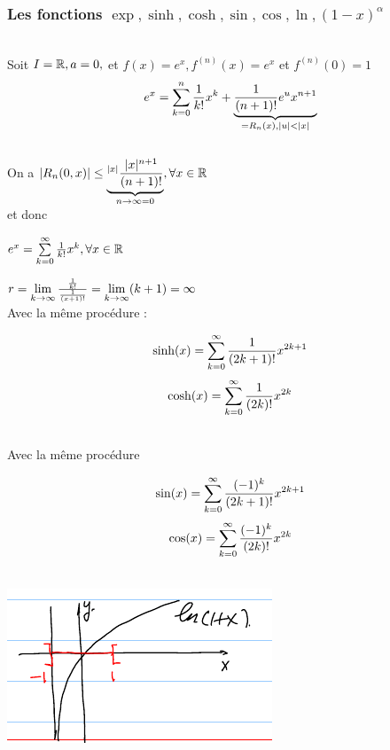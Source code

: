 \documentclass[12pt,a4paper]{article}
\begin{document}
{\subsubsection{Les fonctions $\exp, \sinh, \cosh, \sin, \cos, \ln, (1-x)^\alpha$}
\\
Soit $I=\R, a=0,$ et $f(x) = e^x, f^{(n)}(x) = e^x$ et $f^{(n)}(0) = 1$
\begin{equation}
	e^x = \somme{n}{k=0}{\frac{1}{k!}x^k} + \underbrace{\frac{1}{(n+1)!}e^ux^{n+1}}_{=R_n(x), |u| < |x|}
\end{equation}
\\
On a $|R_n(0,x)| \leq \underbrace{^{|x|} \frac{|x|^{n+1}}{(n+1)!}}_{\ninf = 0}, \forall x \in \R$\\
et donc
\begin{boite}
$e^x = \somme{\infty}{k=0}{\frac{1}{k!}x^k}, \forall x \in \R$
\end{boite}
$r = \limite{k\to\infty}\frac{\frac{1}{k!}}{\frac{1}{(x+1)!}} = \limite{k\to\infty}(k+1) = \infty$
\\
Avec la même procédure :
\begin{boite}
\begin{equation}
\sinh (x) = \somme{\infty}{k=0}{\frac{1}{(2k+1)!}x^{2k+1}}
\end{equation}
\begin{equation}
\cosh( x) = \somme{\infty}{k=0}{\frac{1}{(2k)!}x^{2k}}
\end{equation}
\end{boite}
\\
Avec la même procédure\\
\begin{boite}
	\begin{equation}	
		\sin(x) = \somme{\infty}{k=0}{\frac{(-1)^k}{(2k+1)!}x^{2k+1}}
	\end{equation}
	\begin{equation}
		\cos(x) = \somme{\infty}{k=0}{\frac{(-1)^k}{(2k)!}x^{2k}}
	\end{equation}
\end{boite}
\\
\includegraphics[scale=0.5]{illustrations_Analyse/ln_1_x}\\
}
\end{document}
